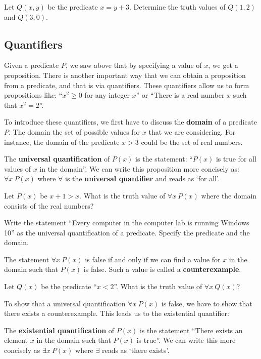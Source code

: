 \example Let $Q(x,y)$ be the predicate $x=y+3$. 
  Determine the truth values of $Q(1,2)$ and $Q(3,0)$.

\subsection{Quantifiers}

Given a predicate $P$, we saw above that by specifying a value of $x$, 
we get a proposition. There is another important way that we can obtain 
a proposition from a predicate, and that is via quantifiers. 
These quantifiers allow us to form propositions like: 
``$x^2\geq 0$ for any integer $x$'' or 
``There is a real number $x$ such that $x^2=2$''.

To introduce these quantifiers, we first have to discuss the 
\textbf{domain} of a predicate $P$. The domain the set of 
possible values for $x$ that we are considering. 
For instance, the domain of the predicate $x>3$ could be the set of real numbers.

\begin{defn}
The \textbf{universal quantification} of $P(x)$ is the statement: 
``$P(x)$ is true for all values of $x$ in the domain''. 
We can write this proposition more concisely as: 
$\forall x\:P(x)$ where $\forall$ is the \textbf{universal quantifier} and reads as `for all'.
\end{defn}

\example Let $P(x)$ be $x+1>x$. What is the truth value of 
  $\forall x\:P(x)$ where the domain consists of the real numbers?

\example Write the statement 
  ``Every computer in the computer lab is running Windows 10'' 
  as the universal quantification of a predicate. Specify the predicate and the domain.

\begin{defn}
  The statement $\forall x\:P(x)$ is false if and only if 
  we can find a value for $x$ in the domain such that $P(x)$ is false. 
  Such a value is called a \textbf{counterexample}.
\end{defn}

\example Let $Q(x)$ be the predicate ``$x<2$''. What is the truth value of $\forall x\:Q(x)$?

To show that a universal quantification $\forall x\:P(x)$ is false, 
we have to show that there exists a counterexample. 
This leads us to the existential quantifier:

\begin{defn}
  The \textbf{existential quantification} of $P(x)$ is the statement 
  ``There exists an element $x$ in the domain such that $P(x)$ is true''. 
  We can write this more concisely as $\exists x\:P(x)$ where $\exists$ reads as `there exists'.
\end{defn}

